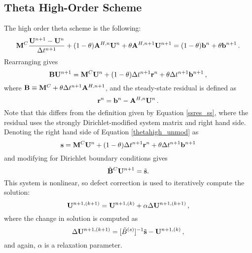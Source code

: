 \subsection{Theta High-Order Scheme}
The high order theta scheme is the following:
\begin{equation}
   \mathbf{M}^C\frac{\mathbf{U}^{n+1}-\mathbf{U}^n}{\Delta t^{n+1}} + (1-\theta)\mathbf{A}^{H,n}\mathbf{U}^n
   + \theta\mathbf{A}^{H,n+1}\mathbf{U}^{n+1} = (1-\theta)\mathbf{b}^n + \theta\mathbf{b}^{n+1} \,.
\end{equation}
Rearranging gives
\begin{equation}\label{thetahigh_unmod}
   \mathbf{B}\mathbf{U}^{n+1} = \mathbf{M}^C\mathbf{U}^n
   + (1-\theta)\Delta t^{n+1}\mathbf{r}^n + \theta\Delta t^{n+1}\mathbf{b}^{n+1} \,,
\end{equation}
where $\mathbf{B}\equiv \mathbf{M}^C+\theta\Delta t^{n+1}\mathbf{A}^{H,n+1}$, and the steady-state
residual is defined as
\begin{equation}
   \mathbf{r}^n = \mathbf{b}^n - \mathbf{A}^{H,n}\mathbf{U}^n \,.
\end{equation}
Note that this differs from the definition given by Equation \eqref{ssres_ss},
where the residual uses the strongly Dirichlet-modified system matrix and right
hand side. Denoting the right hand side of Equation \eqref{thetahigh_unmod} as
\begin{equation}
   \mathbf{s} = \mathbf{M}^C\mathbf{U}^n + (1-\theta)\Delta t^{n+1}\mathbf{r}^n + \theta\Delta t^{n+1}\mathbf{b}^{n+1}
\end{equation}
and modifying for Dirichlet boundary conditions gives
\begin{equation}
   \tilde{\mathbf{B}}^C\mathbf{U}^{n+1} = \tilde{\mathbf{s}}.
\end{equation}
This system is nonlinear, so defect correction is used to iteratively
compute the solution:
\begin{equation}
   \mathbf{U}^{n+1,(k+1)} = \mathbf{U}^{n+1,(k)} + \alpha\Delta\mathbf{U}^{n+1,(k+1)} \,,
\end{equation}
where the change in solution is computed as
\begin{equation}
   \Delta\mathbf{U}^{n+1,(k+1)} = [\tilde{B}^{(s)}]^{-1}\tilde{\mathbf{s}} - \mathbf{U}^{n+1,(k)} \,,
\end{equation}
and again, $\alpha$ is a relaxation parameter.

